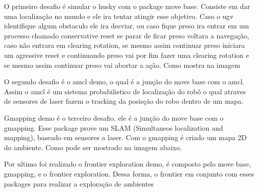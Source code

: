 {O primeiro desafio é simular o husky com o package move base. 
Consiste em dar uma localização no mundo e ele ira tentar atingir 
esse objetivo. Caso o ugv identifique algum obstaculo ele ira desviar,
ou caso fique preso ira entrar em um processo chamado conservative reset
se parar de ficar preso voltara a navegação, caso não entrara em 
clearing rotation, se mesmo assim continuar preso iniciara um agressive reset
e continuando preso vai por fim fazer uma clearing rotation e se mesmo 
assim continuar preso vai abortar a ação. Como mostra na imagem


O segundo desafio é o amcl demo, o qual é a junção do move base com o
amcl. Assim o amcl é um sistema probabilistico de localização do robô
o qual atraves de sensores de laser fazem o tracking da posisção do 
robo dentro de um mapa.


Gmapping demo é o terceiro desafio, ele é a junção do move base com o
gmapping. Esse package prove um SLAM (Simultaneos localization and mapping), 
baseado em sensores a laser. Com o gmapping é criado um mapa 2D do ambiente.
Como pode ser mostrado na imagem abaixo.


Por ultimo foi realizado o frontier exploration demo, é composto 
pelo move base, gmapping, e o frontier exploration. Dessa forma,
o frontier em conjunto com esses packages para realizar a 
exploração de ambientes





}
